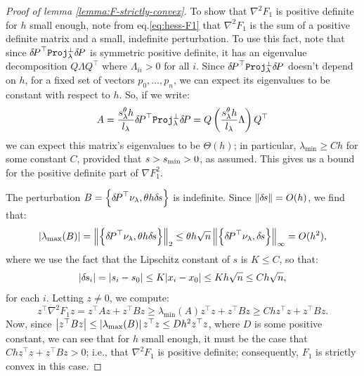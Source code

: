 \documentclass[smallcondensed]{svjour3}
\begin{document}
\begin{proof}[Proof of lemma \ref{lemma:F-strictly-convex}]
  To show that $\nabla^2 F_1$ is positive definite for $h$ small
  enough, note from eq.\@ \ref{eq:hess-F1} that $\nabla^2 F_1$ is
  the sum of a positive definite matrix and a small, indefinite
  perturbation. To use this fact, note that since
  ${\delta \hspace{-0.14em} P}^\top \mathtt{Proj}^\perp_\lambda {\delta \hspace{-0.14em} P}$ is symmetric positive
  definite, it has an eigenvalue decomposition $Q \Lambda Q^\top$
  where $\Lambda_{ii} > 0$ for all $i$. Since
  ${\delta \hspace{-0.14em} P}^\top \mathtt{Proj}^\perp_\lambda {\delta \hspace{-0.14em} P}$ doesn't depend on $h$,
  for a fixed set of vectors $p_0, \hdots, p_n$, we can expect its
  eigenvalues to be constant with respect to $h$. So, if we write:
  \begin{equation}
    A = \frac{s^\theta_\lambda h}{l_\lambda} {\delta \hspace{-0.14em} P}^\top \mathtt{Proj}^\perp_\lambda {\delta \hspace{-0.14em} P} = Q \left(\frac{s^\theta_\lambda h}{l_\lambda} \Lambda\right) Q^\top
  \end{equation}
  we can expect this matrix's eigenvalues to be $\Theta(h)$; in
  particular, $\lambda_{\min} \geq C h$ for some constant $C$,
  provided that $s > s_{\operatorname{min}} > 0$, as assumed. This gives us a bound for
  the positive definite part of $\nabla F_1^2$.

  The perturbation $B = \left\{{\delta \hspace{-0.14em} P}^\top \nu_\lambda, \theta h {\delta \hspace{-0.1em} s}\right\}$
  is indefinite. Since $\left\|{\delta \hspace{-0.1em} s}\right\| = O(h)$, we find that:
  \begin{equation}
    |\lambda_{\max}(B)| = \left\|\left\{{\delta \hspace{-0.14em} P}^\top \nu_\lambda,
        \theta h {\delta \hspace{-0.1em} s}\right\}\right\|_2 \leq \theta h \sqrt{n} \left\|\left\{{\delta \hspace{-0.14em} P}^\top \nu_\lambda, {\delta \hspace{-0.1em} s}\right\}\right\|_\infty = O(h^2),
  \end{equation}
  where we use the fact that the Lipschitz constant of $s$ is
  $K \leq C$, so that:
  \begin{equation}
    |{\delta \hspace{-0.1em} s}_i| = |s_i - s_0| \leq K |x_i - x_0| \leq K h \sqrt{n}
    \leq Ch \sqrt{n},
  \end{equation}
  for each $i$. Letting $z \neq 0$, we compute:
  \begin{equation}
    z^\top \nabla^2 F_1 z = z^\top A z + z^\top B z \geq \lambda_{\min}(A) z^\top z + z^\top B z \geq Ch z^\top z + z^\top B z.
  \end{equation}
  Now, since
  $\left|z^\top B z\right| \leq \left|\lambda_{\max}(B)\right| z^\top z \leq D h^2
  z^\top z$, where $D$ is some positive constant, we can see that for
  $h$ small enough, it must be the case that
  $Ch z^\top z + z^\top B z > 0$; i.e., that $\nabla^2 F_1$ is
  positive definite; consequently, $F_1$ is strictly convex in this case.
\end{proof}
\end{document}
